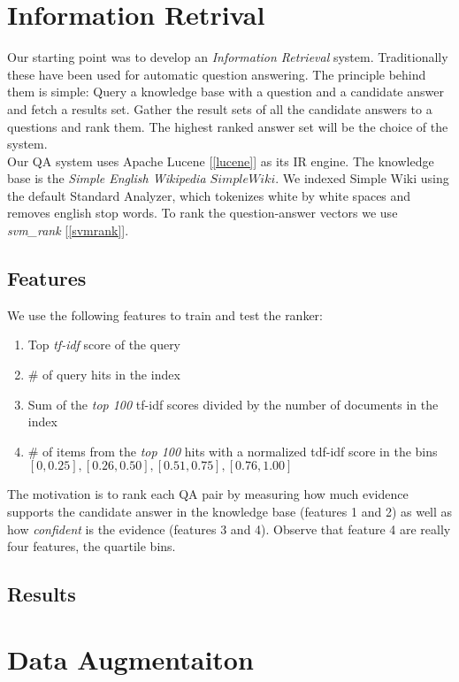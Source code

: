 \section{Information Retrival}
Our starting point was to develop an \emph{Information Retrieval} system. Traditionally these have been used for automatic question answering. The principle behind them is simple: Query a knowledge base with a question and a candidate answer and fetch a results set.  Gather the result sets of all the candidate answers to a questions and rank them. The highest ranked answer set will be the choice of the system.\\

Our QA system uses Apache Lucene [\ref{lucene}] as its IR engine. The knowledge base is the \emph{Simple English Wikipedia \(Simple Wiki\)}. We indexed Simple Wiki using the default Standard Analyzer, which tokenizes white by white spaces and removes english stop words. To rank the question-answer vectors we use \emph{svm\_rank} [\ref{svmrank}].

\subsection{Features}

We use the following features to train and test the ranker:

\begin{enumerate}
\item Top \emph{tf-idf} score of the query
\item \# of query hits in the index
\item Sum of the \emph{top 100} tf-idf scores divided by the number of documents in the index
\item \# of items from the \emph{top 100} hits with a normalized tdf-idf score in the bins $[0, 0.25], [0.26, 0.50], [0.51, 0.75],  [0.76, 1.00]$
\end{enumerate}

The motivation is to rank each QA pair by measuring how much evidence supports the candidate answer in the knowledge base (features 1 and 2) as well as how \emph{confident} is the evidence (features 3 and 4). Observe that feature 4 are really four features, the quartile bins.\\

\subsection{Results}


\section{Data Augmentaiton}